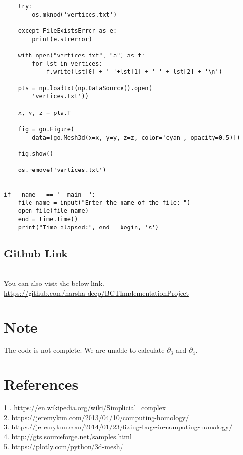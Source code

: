 \documentclass[11pt]{article}
\begin{document}
\begin{verbatim}
    try:
        os.mknod('vertices.txt')

    except FileExistsError as e:
        print(e.strerror)

    with open("vertices.txt", "a") as f:
        for lst in vertices:
            f.write(lst[0] + ' '+lst[1] + ' ' + lst[2] + '\n')

    pts = np.loadtxt(np.DataSource().open(
        'vertices.txt'))

    x, y, z = pts.T

    fig = go.Figure(
        data=[go.Mesh3d(x=x, y=y, z=z, color='cyan', opacity=0.5)])

    fig.show()

    os.remove('vertices.txt')


if __name__ == '__main__':
    file_name = input("Enter the name of the file: ")
    open_file(file_name)
    end = time.time()
    print("Time elapsed:", end - begin, 's')

\end{verbatim}
\subsection{Github Link} \\
You can also visit the below link. \\
\url{https://github.com/harsha-deep/BCTImplementationProject}

\section{Note}
The code is not complete. We are unable to calculate $\partial_3$ and $\partial_4$. 

\section{References}
1 . \url{https://en.wikipedia.org/wiki/Simplicial_complex} \\
2. \url{https://jeremykun.com/2013/04/10/computing-homology/} \\
3. \url{https://jeremykun.com/2014/01/23/fixing-bugs-in-computing-homology/} \\
4. \url{http://gts.sourceforge.net/samples.html} \\
5. \url{https://plotly.com/python/3d-mesh/}
\end{document}
